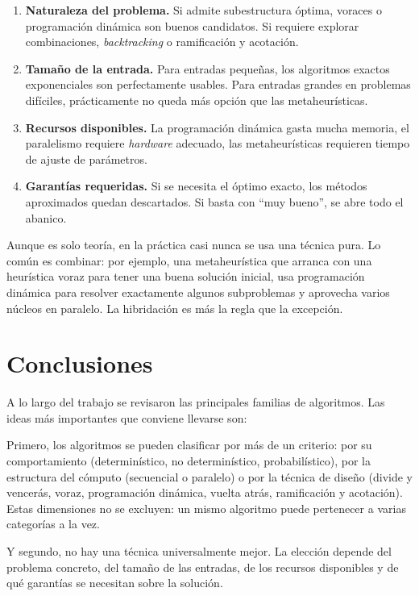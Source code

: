 \documentclass[12pt,letterpaper]{article}
\begin{document}
\begin{enumerate}
    \item \textbf{Naturaleza del problema.} Si admite subestructura óptima, 
    voraces o programación dinámica son buenos candidatos. Si requiere explorar 
    combinaciones, \emph{backtracking} o ramificación y acotación.
    \item \textbf{Tamaño de la entrada.} Para entradas pequeñas, los algoritmos 
    exactos exponenciales son perfectamente usables. Para entradas grandes en 
    problemas difíciles, prácticamente no queda más opción que las 
    metaheurísticas.
    \item \textbf{Recursos disponibles.} La programación dinámica gasta mucha 
    memoria, el paralelismo requiere \emph{hardware} adecuado, las 
    metaheurísticas requieren tiempo de ajuste de parámetros.
    \item \textbf{Garantías requeridas.} Si se necesita el óptimo exacto, los 
    métodos aproximados quedan descartados. Si basta con ``muy bueno'', se abre 
    todo el abanico.
\end{enumerate}

Aunque es solo teoría, en la práctica casi nunca se usa una técnica pura. Lo 
común es combinar: por ejemplo, una metaheurística que arranca con una 
heurística voraz para tener una buena solución inicial, usa programación 
dinámica para resolver exactamente algunos subproblemas y aprovecha varios 
núcleos en paralelo. La hibridación es más la regla que la excepción.

\section{Conclusiones}
\label{sec:conclusiones}

A lo largo del trabajo se revisaron las principales familias de algoritmos. 
Las ideas más importantes que conviene llevarse son:

Primero, los algoritmos se pueden clasificar por más de un criterio: por su 
comportamiento (determinístico, no determinístico, probabilístico), por la 
estructura del cómputo (secuencial o paralelo) o por la técnica de diseño 
(divide y vencerás, voraz, programación dinámica, vuelta atrás, ramificación 
y acotación). Estas dimensiones no se excluyen: un mismo algoritmo puede 
pertenecer a varias categorías a la vez.

Y segundo, no hay una técnica universalmente mejor. La elección depende del 
problema concreto, del tamaño de las entradas, de los recursos disponibles y 
de qué garantías se necesitan sobre la solución.
\end{document}
